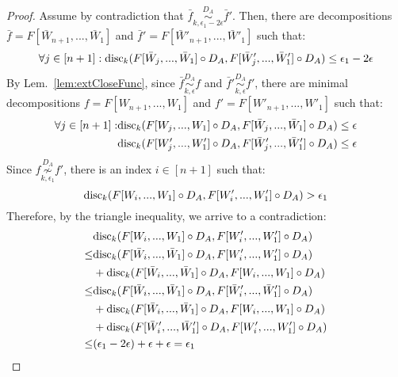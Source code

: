 \documentclass{article} %
\newcommand{\disc}{\textnormal{disc}}
\begin{document}
 

\begin{proof} Assume by contradiction that $\bar{f} \overset{D_A}{\underset{k,\epsilon_1-2\epsilon}{\sim}} \bar{f}'$. Then, there are decompositions $\bar{f} = F[\bar{W}_{n+1},...,\bar{W}_1]$ and $\bar{f}' = F[\bar{W}'_{n+1},...,\bar{W}'_1]$ such that: 
\begin{equation}
\forall j\in [n+1]: \disc_k(F[\bar{W}_{j},...,\bar{W}_1] \circ D_A, F[\bar{W}'_{j},...,\bar{W}'_1] \circ D_A) \leq \epsilon_1 - 2\epsilon
\end{equation}
By Lem.~\ref{lem:extCloseFunc}, since $\bar{f} \overset{D_A}{\underset{k,\epsilon}{\sim}} f$ and $\bar{f}' \overset{D_A}{\underset{k,\epsilon}{\sim}} f'$, there are minimal decompositions $f = F[W_{n+1},...,W_1]$ and $f' = F[W'_{n+1},...,W'_1]$ such that:
\begin{equation}
\begin{aligned}
\forall j\in [n+1]: &\disc_k(F[W_{j},...,W_1] \circ D_A,F[\bar{W}_{j},...,\bar{W}_1] \circ D_A) \leq \epsilon \\
&\disc_k(F[W'_{j},...,W'_1] \circ D_A,F[\bar{W}'_{j},...,\bar{W}'_1] \circ D_A) \leq \epsilon 
\end{aligned}
\end{equation}
Since $f \overset{D_A}{\underset{k,\epsilon_1}{\not\sim}} f'$, there is an index $i \in [n+1]$ such that:
\begin{equation}
\disc_k(F[W_{i},...,W_1] \circ D_A, F[W'_i,...,W'_1] \circ D_A) > \epsilon_1
\end{equation}
Therefore, by the triangle inequality, we arrive to a contradiction:
\begin{equation}
\begin{aligned}
&\disc_k(F[W_{i},...,W_1] \circ D_A, F[W'_i,...,W'_1] \circ D_A) \\
\leq& \disc_k(F[\bar{W}_{i},...,\bar{W}_1] \circ D_A,F[W'_i,...,W'_1] \circ D_A) \\
&+ \disc_k(F[\bar{W}_{i},...,\bar{W}_1] \circ D_A,F[W_{i},...,W_1] \circ D_A) \\
\leq& \disc_k(F[\bar{W}_{i},...,\bar{W}_1] \circ D_A,F[\bar{W}'_i,...,\bar{W}'_1] \circ D_A) \\
&+ \disc_k(F[\bar{W}_{i},...,\bar{W}_1] \circ D_A,F[W_{i},...,W_1] \circ D_A) \\
&+ \disc_k(F[\bar{W}'_i,...,\bar{W}'_1] \circ D_A,F[W'_i,...,W'_1] \circ D_A) \\
\leq& (\epsilon_1-2\epsilon)+\epsilon+\epsilon = \epsilon_1
\end{aligned}
\end{equation} 
\end{proof}
\end{document}
